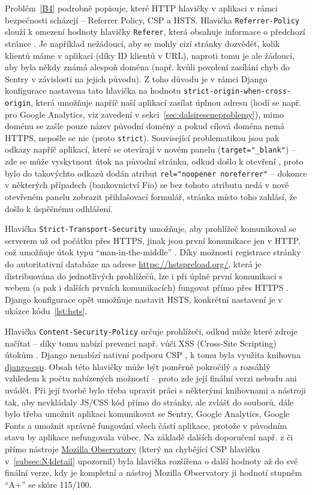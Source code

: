 Problém~\ref{B4} podrobně popisuje, které HTTP hlavičky v aplikaci v rámci bezpečnosti scházejí -- Referrer Policy, CSP a HSTS. Hlavička \verb|Referrer-Policy| slouží k omezení hodnoty hlavičky \verb|Referer|, která obsahuje informace o předchozí stránce \cite{securityheaders-referer}. Je například nežádoucí, aby se mohly cizí stránky dozvědět, kolik klientů máme v aplikací (díky ID klientů v URL), naproti tomu je ale žádoucí, aby byla někdy známá alespoň doména (např. kvůli povolení zasílání chyb do Sentry v závislosti na jejich původu). Z toho důvodu je v rámci Django konfigurace nastavena tato hlavička na hodnotu \verb|strict-origin-when-cross-origin|, která umožňuje napříč naší aplikací zasílat úplnou adresu (hodí se např. pro Google Analytics, viz zavedení v sekci~\ref{sec:dalsireseneproblemy}), mimo doménu se zašle pouze název původní domény a pokud cílová doména nemá HTTPS, nepošle se nic (proto \verb|strict|). Související problematikou jsou pak odkazy napříč aplikací, které se otevírají v novém panelu (\verb|target="_blank"|) -- zde se může vyskytnout útok na původní stránku, odkud došlo k otevření \cite{noopener}, proto bylo do takovýchto odkazů dodán atribut \verb|rel="noopener noreferrer"| -- dokonce v některých případech (bankovnictví Fio) se bez tohoto atributu nedá v nově otevřeném panelu zobrazit přihlašovací formulář, stránka místo toho zahlásí, že došlo k úspěšnému odhlášení.

Hlavička \verb|Strict-Transport-Security| umožňuje, aby prohlížeč komunikoval se serverem už od počátku přes HTTPS, jinak jsou první komunikace jen v HTTP, což umožňuje útok typu \enquote{man-in-the-middle} \cite{securityheaders-hsts}. Díky možnosti registrace stránky do autoritativní databáze na adrese \href{https://hstspreload.org/}{https://hstspreload.org/}, která je distribuována do jednotlivých prohlížečů, lze i při úplně první komunikaci s webem (a pak i dalších prvních komunikacích) fungovat přímo přes HTTPS \cite{jakpsatweb-hsts}. Django konfigurace opět umožňuje nastavit HSTS, konkrétní nastavení je v ukázce kódu~\ref{lst:hsts}.

Hlavička \verb|Content-Security-Policy| určuje prohlížeči, odkud může které zdroje načítat -- díky tomu nabízí prevenci např. vůči XSS (Cross-Site Scripting) útokům \cite{adamj}. Django nenabízí nativní podporu CSP \cite{adamj}, k tomu byla využita knihovna \href{https://django-csp.readthedocs.io/en/latest/}{django-csp}. Obsah této hlavičky může být poměrně pokročilý a rozsáhlý vzhledem k počtu nabízených možností \cite{adamj} -- proto zde její finální verzi nebudu ani uvádět. Při její tvorbě bylo třeba upravit práci s některými knihovnami a nástroji tak, aby nevkládaly JS/CSS kód přímo do stránky, ale zvlášť do souborů, dále bylo třeba umožnit aplikaci komunikovat se Sentry, Google Analytics, Google Fonts a umožnit správné fungování všech částí aplikace, protože v původním stavu by aplikace nefungovala vůbec. Na základě dalších doporučení např. z \cite{dareboost} či přímo nástroje \href{https://observatory.mozilla.org/}{Mozilla Observatory} (který na chybějící CSP hlavičku v~\ref{subsec:N4detail} upozornil) byla hlavička rozšířena o další hodnoty až do své finální verze, kdy je kompletní a nástroj Mozilla Observatory ji hodnotí stupněm \enquote{A+} se skóre 115/100.

